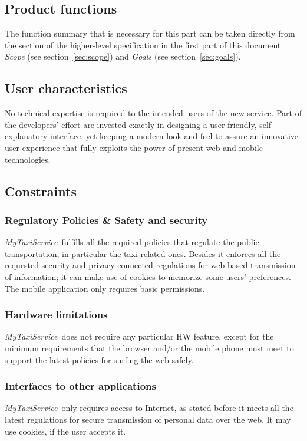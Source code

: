 \documentclass[a4paper,11pt]{report} %
\newcommand{\mts}{\mbox{\normalfont\itshape MyTaxiService\ }}
\begin{document}
	\subsection{Product functions} The function summary that is necessary for this part can be taken directly from the section of the higher-level specification in the first part of this document {\em Scope} (see section~\ref{sec:scope}) and {\em Goals} (see section~\ref{sec:goals}).
	
	\subsection{User characteristics} No technical expertise is required to the intended users of the new service. Part of the developers' effort are invested exactly in designing a user-friendly, self-explanatory interface, yet keeping a modern look and feel to assure an innovative user experience that fully exploits the power of present web and mobile technologies.  
	
	\subsection{Constraints}
	
	\subsubsection{Regulatory Policies \& Safety and security} \mts fulfills all the required policies that regulate the public transportation, in particular the taxi-related ones. Besides it enforces all the requested security and privacy-connected regulations for web based transmission of information; it can make use of cookies to memorize some users' preferences. The mobile application only requires basic permissions.
	
	\subsubsection{Hardware limitations} \mts does not require any particular HW feature, except for the minimum requirements that the browser and/or the mobile phone must meet to support the latest policies for surfing the web safely.
	
	\subsubsection{Interfaces to other applications} \mts only requires access to Internet, as stated before it meets all the latest regulations for secure transmission of personal data over the web. It may use cookies, if the user accepts it.
	
\end{document}
